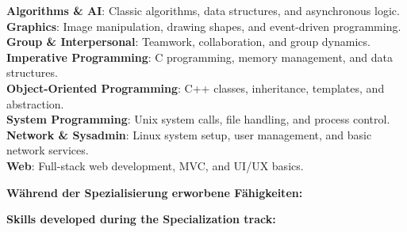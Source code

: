 \documentclass[11pt]{article}
\begin{document}
{{{{{{{{{{{{\noindent \textbf{Algorithms \& AI}: Classic algorithms, data structures, and asynchronous logic.\\
\noindent \textbf{Graphics}: Image manipulation, drawing shapes, and event-driven programming.\\
\noindent \textbf{Group \& Interpersonal}: Teamwork, collaboration, and group dynamics.\\
\noindent \textbf{Imperative Programming}: C programming, memory management, and data structures.\\
\noindent \textbf{Object-Oriented Programming}: C++ classes, inheritance, templates, and abstraction.\\
\noindent \textbf{System Programming}: Unix system calls, file handling, and process control.\\
\noindent \textbf{Network \& Sysadmin}: Linux system setup, user management, and basic network services.\\
\noindent \textbf{Web}: Full-stack web development, MVC, and UI/UX basics.\\
{%

\vspace{1.0cm}
{%
  {%
  \noindent\textbf{Während der Spezialisierung erworbene Fähigkeiten:}
  {%
  \noindent\textbf{Skills developed during the Specialization track:}
  {%

  \vspace{0.5em}

}}}}}}}}}}}}}}}}}
\end{document}
